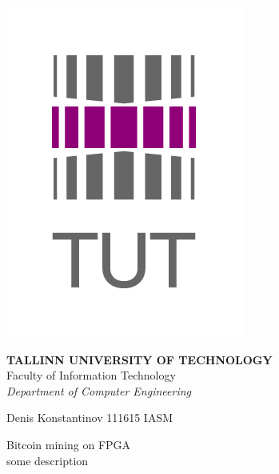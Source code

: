 \begin{titlepage}
	\begin{center}	
		\begin{minipage}[h]{0.01\linewidth}
			\begin{flushleft}	
				\includegraphics[scale=0.2]{../images/template/ttu_logo_2.jpg}
			\end{flushleft}		
		\end{minipage}
		\begin{minipage}[h]{0.98\linewidth}
			\begin{center}
				
				\textbf{TALLINN UNIVERSITY OF TECHNOLOGY}\\			
				Faculty of Information Technology \\			
				\textit{Department of Computer Engineering} \\			
		
			\end{center}
		\end{minipage}
	\end{center}
	\vspace{3cm}
	
	\begin{center}
		Denis Konstantinov \footnotesize \textsf{111615 IASM}
	\end{center}
	
	\vspace{5em}
	
	\begin{center} 
		\Large {Bitcoin mining on FPGA}\\
		\vspace{1em}
		\small {some description}\\	
	\end{center}
	

\end{titlepage}
